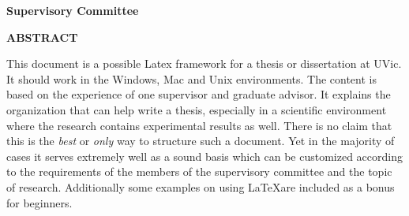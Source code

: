 \newpage
{}

\noindent \textbf{Supervisory Committee}
\tpbreak

\begin{center}
\textbf{ABSTRACT}
\end{center}

This document is a possible Latex framework for a thesis or dissertation at UVic. It should work in the Windows, Mac and Unix environments. The content is based on the experience of one supervisor and graduate advisor. It explains the organization that can help write a thesis, especially in a scientific environment where the research contains experimental results as well. There is no claim that this is the \textit{best} or \textit{only} way to structure such a document. Yet in the majority of cases it serves extremely well as a sound basis which can be customized according to the requirements of the members of the supervisory committee and the topic of  research. Additionally some examples on using \LaTeX are included as a bonus for beginners.
